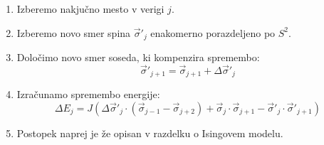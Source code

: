 \documentclass[a4paper]{article}
\newcommand{\s}{\sigma}
\newcommand{\vs}{\vec{\s}}
\newcommand{\D}{\Delta}
\begin{document}
    \begin{enumerate}
        \item Izberemo nakjučno mesto v verigi $j$.
        \item Izberemo novo smer spina $\vs'_j$ enakomerno porazdeljeno po $S^2$.
        \item Določimo novo smer soseda, ki kompenzira spremembo:
        \begin{equation}\label{eq12}
            \vs'_{j+1} = \vs_{j+1} + \D \vs'_j
        \end{equation}
        \item Izračunamo spremembo energije:
        \begin{equation}\label{eq13}
            \D E_j = J(\D \vs'_{j} \cdot (\vs_{j-1} - \vs_{j+2}) + \vs_j \cdot \vs_{j+1} - \vs'_j \cdot \vs'_{j+1})
        \end{equation}
        \item Postopek naprej je že opisan v razdelku o Isingovem modelu.
    \end{enumerate}

    \iffalse
    \begin{figure}
        \centering
        \texttt{[image: slika16.pdf]}
        \caption{Odvisnost toka $J$ med termostatom in verigo v odvisnosti od časa vzorčenja $\tau$.
        Računano je na anharmonski ($\lambda = 1$) verigi dolžine $N = 10$ in povprečeno po $1000$ vzorcih.
        $J_1$ se nanaša na tok na levi, $J_2$ pa na desni strani verige.}
        \label{slika6}
    \end{figure}
    \fi
\end{document}
